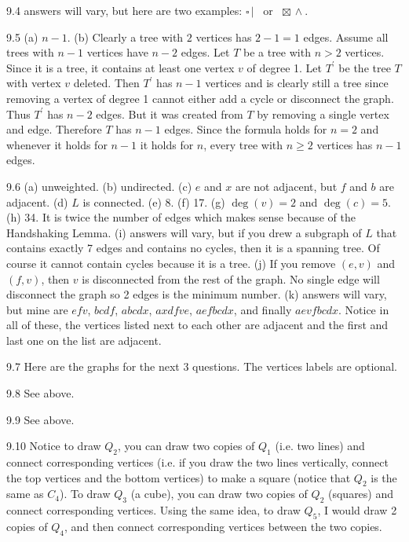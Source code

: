 \begin{RequAnswer}{9.4}
answers will vary, but here are two examples:  $\square \, |$ \, or \,  $\boxtimes \, \wedge$.
\end{RequAnswer}
\begin{RequAnswer}{9.5}
(a) $n-1$.
(b) Clearly a tree with $2$ vertices has $2-1=1$ edges.
Assume all trees with $n-1$ vertices have $n-2$ edges.
Let $T$ be a tree with $n>2$ vertices. Since it is a tree, it contains at least one vertex $v$ of degree 1.
Let $T^\prime$ be the tree $T$ with vertex $v$ deleted.
Then $T^\prime$ has $n-1$ vertices and
is clearly still a tree since removing a vertex of degree 1 cannot either add a cycle or disconnect the graph.
Thus $T^{\prime}$ has $n-2$ edges. But it was created from $T$ by removing a single vertex and edge.
Therefore $T$ has $n-1$ edges.
Since the formula holds for $n=2$ and whenever it holds for $n-1$ it holds for $n$,
every tree with $n\geq 2$ vertices has $n-1$ edges.
\end{RequAnswer}
\begin{RequAnswer}{9.6}
(a) unweighted.
(b) undirected.
(c) $e$ and $x$ are not adjacent, but  $f$ and $b$ are adjacent.
(d) $L$ is connected.
(e) 8.
(f) 17.
(g) $\deg(v)=2$ and $\deg(c)=5$.
(h) 34. It is twice the number of edges which makes sense because of the Handshaking Lemma.
(i) answers will vary, but if you drew a subgraph of $L$ that contains exactly 7 edges and contains no cycles,
then it is a spanning tree. Of course it cannot contain cycles because it is a tree.
(j) If you remove $(e,v)$ and $(f,v)$, then $v$ is disconnected from the rest of the graph. No single edge
will disconnect the graph so 2 edges is the minimum number.
(k) answers will vary, but mine are $efv$, $bcdf$, $abcdx$, $axdfve$, $aefbcdx$, and finally $aevfbcdx$.
Notice in all of these, the vertices listed next to each other are adjacent and the first and last one on the list are adjacent.
\end{RequAnswer}
\begin{RequAnswer}{9.7}
Here are the graphs for the next 3 questions.
The vertices labels are optional.

\end{RequAnswer}
\begin{RequAnswer}{9.8}
See above.
\end{RequAnswer}
\begin{RequAnswer}{9.9}
See above.
\end{RequAnswer}
\begin{RequAnswer}{9.10}
Notice to draw $Q_2$, you can draw two copies of $Q_1$ (i.e. two lines) and connect corresponding
vertices (i.e. if you draw the two lines vertically, connect the top vertices and the bottom vertices) to
make a square (notice that $Q_2$ is the same as $C_4$).
To draw $Q_3$ (a cube), you can draw two copies of $Q_2$ (squares) and connect corresponding vertices.
Using the same idea, to draw $Q_5$,
I would draw 2 copies of $Q_4$, and then connect corresponding vertices between the two copies.
\end{RequAnswer}
